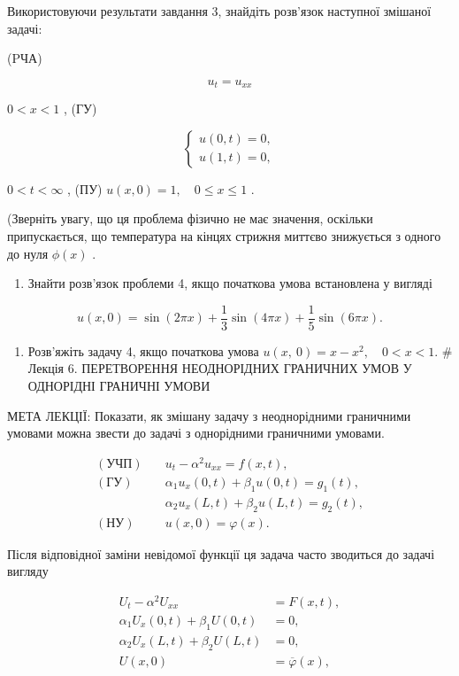 \documentclass[
  ukrainian,
]{article}
\providecommand{\tightlist}{%
  \setlength{\itemsep}{0pt}\setlength{\parskip}{0pt}}
\begin{document}
Використовуючи результати завдання 3, знайдіть розв'язок наступної
змішаної задачі:

(PЧА)

\[
u_t = u_{xx}
\]

\(0 < x < 1\) , (ГУ)

\[
\begin{cases} u(0, t) = 0, \\ u(1, t) = 0, \end{cases}
\]

\(0 < t < \infty\) , (ПУ) \(u(x, 0) = 1, \quad 0 \le x \le 1\) .

(Зверніть увагу, що ця проблема фізично не має значення, оскільки
припускається, що температура на кінцях стрижня миттєво знижується з
одного до нуля \(\phi(x)\) .

\begin{enumerate}
\def\labelenumi{\arabic{enumi}.}
\setcounter{enumi}{4}
\tightlist
\item
  Знайти розв'язок проблеми 4, якщо початкова умова встановлена у
  вигляді
\end{enumerate}

\[
u(x, 0) = \sin(2\pi x) + \frac{1}{3}\sin(4\pi x) + \frac{1}{5}\sin(6\pi x).
\]

\begin{enumerate}
\def\labelenumi{\arabic{enumi}.}
\setcounter{enumi}{5}
\tightlist
\item
  Розв'яжіть задачу 4, якщо початкова умова
  \(u\left( x,\ 0\right) =x-x^{2},\quad 0< x<1.\) \# Лекція 6.
  ПЕРЕТВОРЕННЯ НЕОДНОРІДНИХ ГРАНИЧНИХ УМОВ У ОДНОРІДНІ ГРАНИЧНІ УМОВИ
\end{enumerate}

МЕТА ЛЕКЦІЇ: Показати, як змішану задачу з неоднорідними граничними
умовами можна звести до задачі з однорідними граничними умовами.

\[
\begin{aligned}
(\text{УЧП})\quad & u_t - \alpha^2 u_{xx} = f(x,t), \\
(\text{ГУ})\quad & \alpha_1 u_x(0,t) + \beta_1 u(0,t) = g_1(t), \\
& \alpha_2 u_x(L,t) + \beta_2 u(L,t) = g_2(t), \\
(\text{НУ})\quad & u(x,0) = \varphi(x).
\end{aligned}
\]

Після відповідної заміни невідомої функції ця задача часто зводиться до
задачі вигляду

\[
\begin{aligned}
U_t - \alpha^2 U_{xx} &= F(x,t), \\
\alpha_1 U_x(0,t) + \beta_1 U(0,t) &= 0, \\
\alpha_2 U_x(L,t) + \beta_2 U(L,t) &= 0, \\
U(x,0) &= \overline{\varphi}(x),
\end{aligned}
\]
\end{document}
